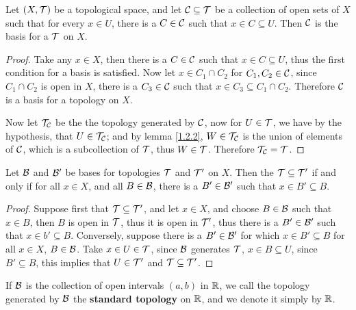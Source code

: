 \begin{lemma}\label{1.2.3}
    Let $(X,\mathcal{T})$ be a topological space, and let  $\mathcal{C} \subseteq \mathcal{T}$ be a collection 
    of open sets of  $X$ such that for every  $x \in U$, there is a  $C \in \mathcal{C}$ such that 
    $x \in  C \subseteq U$. Then  $\mathcal{C}$ is the basis for a $\mathcal{T}$ on  $X$.
\end{lemma}
\begin{proof}
    Take any $x \in X$, then there is a  $C \in \mathcal{C}$ such that 	$x \in C \subseteq U$, 
    thus the first condition for a basis is satisfied. Now let  $x \in C_1 \cap C_2$ for 
    $C_1, C_2 \in \mathcal{C}$, since $C_1 \cap C_2$ is open in $X$, there is a  $C_3 \in \mathcal{C}$ such that 
    $x \in C_3 \subseteq C_1 \cap C_2$. Therefore $\mathcal{C}$ is a basis for a topology on  $X$.

    Now let $\mathcal{T}_{\mathcal{C}}$ be the the topology generated by  $\mathcal{C}$, now for  $U \in \mathcal{T}$, we have 
    by the hypothesis, that  $U \in \mathcal{T}_{\mathcal{C}}$; and by lemma \ref{1.2.2},  $W \in \mathcal{T}_{\mathcal{C}}$ is the 
    union of elements of  $\mathcal{C}$, which is a subcollection of  $\mathcal{T}$, thus  $W \in \mathcal{T}$. Therefore 
     $\mathcal{T}_{\mathcal{C}}=\mathcal{T}$.
\end{proof}

\begin{lemma}\label{1.2.4}
    Let $\mathcal{B}$ and  $\mathcal{B}'$ be bases for topologies  $\mathcal{T}$ and  $\mathcal{T}'$ on  $X$. Then the 
     $\mathcal{T} \subseteq \mathcal{T}'$ if and only if for all  $x \in X$, and all  $B \in \mathcal{B}$, there is a  $B' \in \mathcal{B}'$ 
     such that  $x \in B' \subseteq B$.
\end{lemma}
\begin{proof}
    Suppose first that $\mathcal{T} \subseteq \mathcal{T}'$, and let $x \in X$, and choose  $B \in \mathcal{B}$ such that 
    $x \in B$, then  $B$ is open in  $\mathcal{T}$, thus it is open in  $\mathcal{T}'$, thus there is a 
     $B' \in \mathcal{B}'$ such that  $x \in b' \subseteq B$. Conversely, suppose there is a  $B' \in \mathcal{B}'$ 
     for which  $x \in B' \subseteq B$ for all  $x \in X$,  $B \in \mathcal{B}$. Take  $x \in U \in \mathcal{T}$, since 
      $\mathcal{B}$ generates  $\mathcal{T}$,  $x \in B \subseteq U$, since  $B' \subseteq B$, this implies that $U \in \mathcal{T}'$ 
      and $\mathcal{T} \subseteq \mathcal{T}'$.
\end{proof}

\begin{definition}
    If $\mathcal{B}$ is the collection of open intervals $(a,b)$ in  $\mathbb{R}$, we call the topology generated 
    by  $\mathcal{B}$ the \textbf{standard topology} on $\mathbb{R}$, and we denote it simply by  $\mathbb{R}$.
\end{definition}

